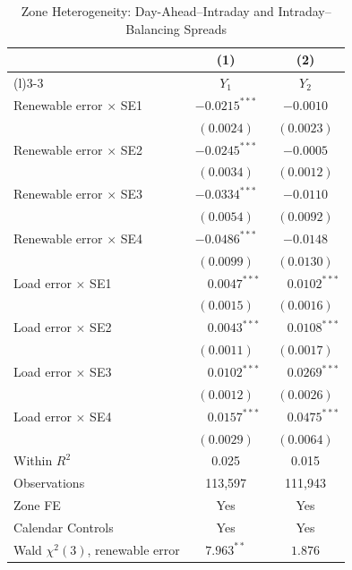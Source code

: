 \begin{table}[htbp]
\centering
\caption{Zone Heterogeneity: Day-Ahead--Intraday and Intraday--Balancing Spreads}
\label{tab:5}
\begin{threeparttable}
\begin{tabularx}{\linewidth}{>{\raggedright\arraybackslash}Xcc}
\toprule
 & (1) & (2) \\
\cmidrule(r){2-2}\cmidrule(l){3-3}
 & $Y_1$ & $Y_2$ \\
\midrule
Renewable error $\times$ SE1 & $-0.0215^{***}$ & $-0.0010$ \\
 & $(0.0024)$ & $(0.0023)$ \\[0.4ex]
Renewable error $\times$ SE2 & $-0.0245^{***}$ & $-0.0005$ \\
 & $(0.0034)$ & $(0.0012)$ \\[0.4ex]
Renewable error $\times$ SE3 & $-0.0334^{***}$ & $-0.0110$ \\
 & $(0.0054)$ & $(0.0092)$ \\[0.4ex]
Renewable error $\times$ SE4 & $-0.0486^{***}$ & $-0.0148$ \\
 & $(0.0099)$ & $(0.0130)$ \\[0.4ex]
Load error $\times$ SE1 & $\phantom{-}0.0047^{***}$ & $\phantom{-}0.0102^{***}$ \\
 & $(0.0015)$ & $(0.0016)$ \\[0.4ex]
Load error $\times$ SE2 & $\phantom{-}0.0043^{***}$ & $\phantom{-}0.0108^{***}$ \\
 & $(0.0011)$ & $(0.0017)$ \\[0.4ex]
Load error $\times$ SE3 & $\phantom{-}0.0102^{***}$ & $\phantom{-}0.0269^{***}$ \\
 & $(0.0012)$ & $(0.0026)$ \\[0.4ex]
Load error $\times$ SE4 & $\phantom{-}0.0157^{***}$ & $\phantom{-}0.0475^{***}$ \\
 & $(0.0029)$ & $(0.0064)$ \\
\midrule
Within $R^2$ & 0.025 & 0.015 \\
Observations & 113,597 & 111,943 \\
Zone FE & Yes & Yes \\
Calendar Controls & Yes & Yes \\
Wald $\chi^2(3)$, renewable error & $7.963^{**}$ & $1.876$ \\

\end{tabularx}
\end{threeparttable}
\end{table}
